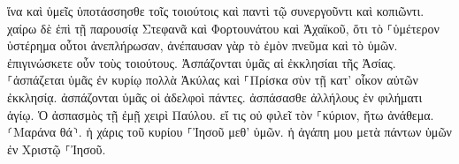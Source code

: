 \documentclass{openreader}
\begin{document}
ἵνα καὶ ὑμεῖς ὑποτάσσησθε τοῖς τοιούτοις καὶ παντὶ τῷ συνεργοῦντι καὶ κοπιῶντι. 
χαίρω δὲ ἐπὶ τῇ παρουσίᾳ Στεφανᾶ καὶ Φορτουνάτου καὶ Ἀχαϊκοῦ, ὅτι τὸ ⸀ὑμέτερον ὑστέρημα οὗτοι ἀνεπλήρωσαν, 
ἀνέπαυσαν γὰρ τὸ ἐμὸν πνεῦμα καὶ τὸ ὑμῶν. ἐπιγινώσκετε οὖν τοὺς τοιούτους. 
Ἀσπάζονται ὑμᾶς αἱ ἐκκλησίαι τῆς Ἀσίας. ⸀ἀσπάζεται ὑμᾶς ἐν κυρίῳ πολλὰ Ἀκύλας καὶ ⸀Πρίσκα σὺν τῇ κατ’ οἶκον αὐτῶν ἐκκλησίᾳ. 
ἀσπάζονται ὑμᾶς οἱ ἀδελφοὶ πάντες. ἀσπάσασθε ἀλλήλους ἐν φιλήματι ἁγίῳ. 
Ὁ ἀσπασμὸς τῇ ἐμῇ χειρὶ Παύλου. 
εἴ τις οὐ φιλεῖ τὸν ⸀κύριον, ἤτω ἀνάθεμα. ⸂Μαράνα θά⸃. 
ἡ χάρις τοῦ κυρίου ⸀Ἰησοῦ μεθ’ ὑμῶν. 
ἡ ἀγάπη μου μετὰ πάντων ὑμῶν ἐν Χριστῷ ⸀Ἰησοῦ. 
\end{document}
